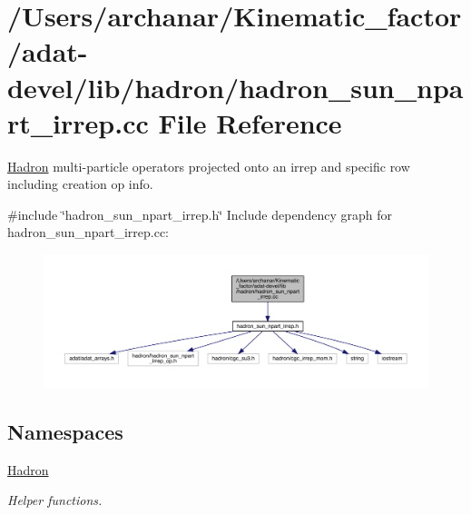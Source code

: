 \hypertarget{adat-devel_2lib_2hadron_2hadron__sun__npart__irrep_8cc}{}\section{/\+Users/archanar/\+Kinematic\+\_\+factor/adat-\/devel/lib/hadron/hadron\+\_\+sun\+\_\+npart\+\_\+irrep.cc File Reference}
\label{adat-devel_2lib_2hadron_2hadron__sun__npart__irrep_8cc}


\mbox{\hyperlink{namespaceHadron}{Hadron}} multi-\/particle operators projected onto an irrep and specific row including creation op info.  


{\ttfamily \#include \char`\"{}hadron\+\_\+sun\+\_\+npart\+\_\+irrep.\+h\char`\"{}}\newline
Include dependency graph for hadron\+\_\+sun\+\_\+npart\+\_\+irrep.\+cc\+:
\nopagebreak
\begin{figure}[H]
\begin{center}
\leavevmode
\includegraphics[width=350pt]{dd/dd7/adat-devel_2lib_2hadron_2hadron__sun__npart__irrep_8cc__incl}
\end{center}
\end{figure}
\subsection*{Namespaces}
\begin{DoxyCompactItemize}
\item 
 \mbox{\hyperlink{namespaceHadron}{Hadron}}
\begin{DoxyCompactList}\small\item\em Helper functions. \end{DoxyCompactList}\end{DoxyCompactItemize}
